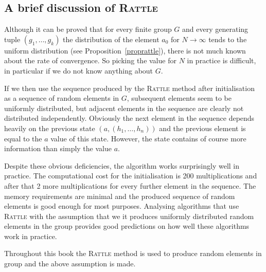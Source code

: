 \subsection{A brief discussion of \textsc{Rattle}}

%
Although it can be proved that for every finite group $G$ and every
generating tuple $(g_1, \ldots, g_k)$ the distribution of the element
$a_0$ for $N \to \infty$ tends to the uniform distribution (see
Proposition~\ref{proprattle}), there is
not much known about the rate of convergence. So picking the value for
$N$ in practice is difficult, in particular if we do not know anything
about $G$.

If we then use the sequence produced by the \textsc{Rattle} method
after initialisation as a sequence of random elements in $G$, 
subsequent elements seem to be uniformly distributed, but adjacent
elements in the sequence are clearly not distributed independently.
Obviously the next element in the sequence depends heavily on the
previous state $(a,(h_1,\ldots,h_n))$ and the previous element is
equal to the $a$ value of this state. However, the state contains of
course more information than simply the value $a$.

Despite these obvious deficiencies, the algorithm
works surprisingly well in practice. The computational cost for the 
initialisation is 200 multiplications and after that 2 more
multiplications for every further element in the sequence.
The memory requirements are minimal and the produced sequence of
random elements is good enough for most purposes. Analysing algorithms
that use \textsc{Rattle}
%
with the assumption that we it produces uniformly distributed random
elements in the group provides good predictions on how
well these algorithms work in practice.

Throughout this book the \textsc{Rattle} method is used to produce
random elements in group and the above assumption is made.
%

